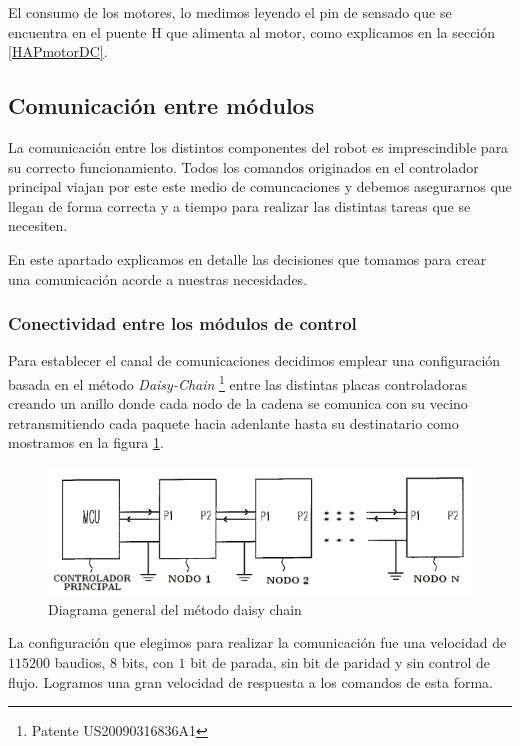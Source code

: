 	El consumo de los motores, lo medimos leyendo el pin de sensado que se encuentra en el puente H que alimenta al motor, como
	explicamos en la secci\'on \ref{HAPmotorDC}.

\subsection{Comunicaci\'on entre m\'odulos}
\label{Hcomm}

	La comunicaci\'on entre los distintos componentes del robot es imprescindible para su correcto funcionamiento. Todos los comandos
	originados en el controlador principal viajan por este este medio de comuncaciones y debemos asegurarnos que llegan de forma correcta
	y a tiempo para realizar las distintas tareas que se necesiten.

En este apartado explicamos en detalle las decisiones que tomamos para crear una comunicaci\'on acorde a nuestras necesidades.

\subsubsection{Conectividad entre los m\'odulos de control}
\label{HCconectividad}

	Para establecer el canal de comunicaciones decidimos emplear una configuraci\'on basada en el m\'etodo \emph{Daisy-Chain}
	\footnote{Patente US20090316836A1} entre las distintas placas controladoras creando un anillo donde cada nodo de la cadena se
	comunica con su vecino retransmitiendo cada paquete hacia adenlante hasta su destinatario como mostramos en la figura
	\ref{daisychain_diagram}.
	
	\begin{figure}[ht]
		\centering
		\includegraphics[scale=.40]{daisychain_diagram.png}
		\caption{Diagrama general del m\'etodo daisy chain}
		\label{daisychain_diagram}
	\end{figure}
	
	La configuraci\'on que elegimos para realizar la comunicaci\'on fue una velocidad de $115200$ baudios, $8$ bits, con $1$ bit de parada,
	sin bit de paridad y sin control de flujo. Logramos una gran velocidad de respuesta a los comandos de esta forma.

